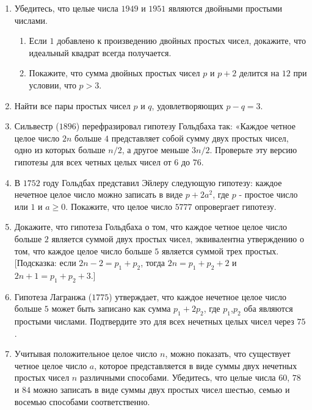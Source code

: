 \documentclass[11pt]{article}
\begin{document}
\begin{enumerate}
\item Убедитесь, что целые числа $1949$ и $1951$ являются двойными простыми числами.

\begin{enumerate}
\item Если $1$ добавлено к произведению двойных простых чисел, докажите, что идеальный квадрат всегда получается.
\item Покажите, что сумма двойных простых чисел $p$ и $p+ 2$ делится на $12$ при условии, что $p>3$.
\end{enumerate}

\item	Найти все пары простых чисел $p$ и $q$, удовлетворяющих $p - q = 3$.

\item	Сильвестр ($1896$) перефразировал гипотезу Гольдбаха так: «Каждое четное целое число $2n$ больше $4$ представляет собой сумму двух простых чисел, одно из которых больше $n/2$, а другое меньше $3n/2$. Проверьте эту версию гипотезы для всех четных целых чисел от $6$ до $76$.

\item	В $1752$ году Гольдбах представил Эйлеру следующую гипотезу: каждое нечетное целое число можно записать в виде $p + 2a^2$, где $p$ - простое число или $1$ и $ a \geq 0$. Покажите, что целое число $5777$ опровергает гипотезу.

\item	Докажите, что гипотеза Гольдбаха о том, что каждое четное целое число больше $2$ является суммой двух простых чисел, эквивалентна утверждению о том, что каждое целое число больше $5$ является суммой трех простых. [Подсказка: если $2n-2=
p_1+p_2$, тогда $2n = p_1+p_2+2$ и $2n+1 = p_1 + p_2 + 3$.]

\item	Гипотеза Лагранжа ($1775$) утверждает, что каждое нечетное целое число больше $5$ может быть записано как сумма $p_1 + 2p_2$, где $p_1$,$p_2$ оба являются простыми числами. Подтвердите это для всех нечетных целых чисел через $75$.

\item	Учитывая положительное целое число $n$, можно показать, что существует четное целое число $a$, которое представляется в виде суммы двух нечетных простых чисел $n$ различными способами. Убедитесь, что целые числа $60$, $78$ и $84$ можно записать в виде суммы двух простых чисел шестью, семью и восемью способами соответственно.


\end{enumerate}
\end{document}
